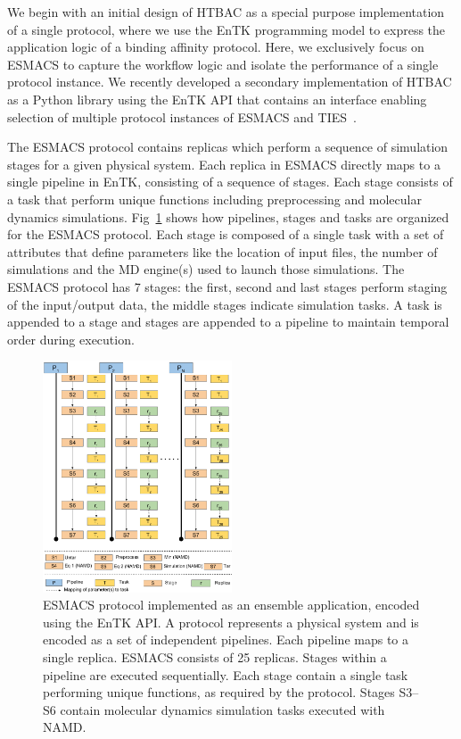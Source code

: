 We begin with an initial design of HTBAC as a special purpose implementation of
a single protocol, where we use the EnTK programming model to express the 
application logic of a binding affinity protocol. Here, we exclusively focus on 
ESMACS to capture the workflow logic and isolate the performance of a 
single protocol instance. We recently developed a secondary implementation of 
HTBAC as a Python library using the EnTK API that contains an interface enabling 
selection of multiple protocol instances of ESMACS and TIES~\cite{dakka}. 

The ESMACS protocol contains replicas which perform a sequence of simulation stages for 
a given physical system. Each replica in ESMACS directly maps to a single pipeline in 
EnTK, consisting of a sequence of stages. Each stage consists of a task that perform 
unique functions including preprocessing and molecular dynamics simulations. 
Fig~\ref{figure:HTBAC} 
shows how pipelines, stages and tasks are organized for the ESMACS
protocol. Each stage is composed of a single task with a set of attributes that define 
parameters like the location of input files, the number of simulations and the MD
engine(s) used to launch those simulations. The ESMACS protocol has 7 stages:
the first, second and last stages perform staging of the input/output data,
the middle stages indicate simulation tasks. A task is appended to a stage and 
stages are appended to a pipeline to maintain temporal order during execution. 

\begin{figure}
\centering
  \includegraphics[width=0.5\textwidth]{FIGURES/HTBAC_Workflow_ESMACS.pdf}
  \caption{ESMACS protocol implemented as an ensemble
  application, encoded using the EnTK
  API. A protocol represents a physical system and is 
  encoded as a set of independent pipelines. Each pipeline maps to a single
  replica. ESMACS consists of 25 replicas. Stages within a pipeline
  are executed sequentially. Each stage contain a single task performing unique
  functions, as required by the protocol. Stages S3--S6 contain molecular
  dynamics simulation tasks executed with NAMD\@.}
  \label{figure:HTBAC}
\end{figure}

